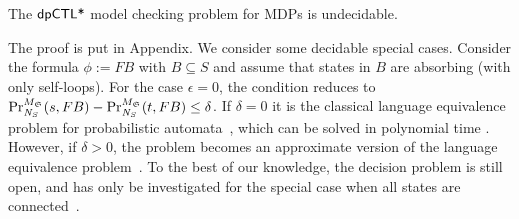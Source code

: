\begin{theorem}\label{theorem:mdp-model-checking}
The $\dpCTLstar$ model checking problem for MDPs  is undecidable.
\end{theorem}

The proof is put in Appendix. We consider some decidable special cases. Consider the formula $\phi:=F B$ with $B\subseteq S$ and assume that states in $B$ are absorbing (with only self-loops). For the case $\epsilon=0$, the condition reduces to
$\myPr{s}{M_{\scheduler{S}}}{\neighbor{S}}{F B} -
\myPr{t}{M_{\scheduler{S}}}{\neighbor{S}}{F B}\le \delta$. If $\delta=0$ it is the classical language equivalence problem for probabilistic automata~\cite{Rabin63}, which can be solved in polynomial time \cite{Tzeng92}. However, if $\delta>0$, the problem
becomes an approximate version of the language equivalence problem~\cite{Tzeng92}. To the best of our knowledge, the decision problem is still open, and has only be investigated for the special case when all states are connected~\cite{Tzeng92}.

